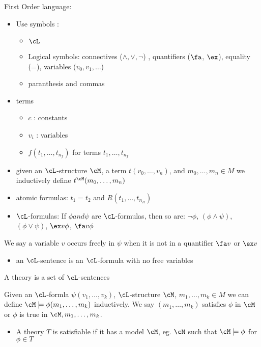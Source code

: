 \noindent
First Order language: 
\begin{itemize}
    \item Use symbols : 
    \begin{itemize}
        \item $\cL$
        \item Logical symbols: connectives ($\wedge, \vee, \neg$) , quantifiers ($\fa$, $\ex$), equality (=), variables ($v_0, v_1, \ldots $) 
        \item paranthesis and commas 
    \end{itemize}
    \item terms 
    \begin{itemize}
        \item $c$ : constants 
        \item $v_i$ : variables 
        \item $f(t_1, \ldots, t_{n_f})$ for terms $t_1, \ldots, t_{n_f}$
    \end{itemize}
    \item given an $\cL$-structure $\cM$, a term $t(v_0, \ldots, v_n)$, and $m_0, \ldots, m_n \in M$ we inductively define $t^{\cM}(m_0, \ldots, m_n)$
    \item atomic formulas: $t_1 = t_2$ and $R(t_1, \ldots, t_{n_R})$
    \item $\cL$-formulas: If $\phi and \psi$ are $\cL$-formulas, then so are: $\neg \phi$, $(\phi \wedge \psi)$, $(\phi \vee \psi)$, $\ex v \phi$, $\fa v \phi$
\end{itemize}

\begin{definition}
    We say a variable $v$ occurs freely in $\psi$ when it is not in a quantifier $\fa v$ or $\ex v$ 
    \begin{itemize}
        \item an $\cL$-sentence is an $\cL$-formula with no free variables 
    \end{itemize}
\end{definition}

\begin{definition}
    A theory is a set of $\cL$-sentences
\end{definition}

\begin{definition}
    Given an $\cL$-formla $\psi(v_1, \ldots, v_k)$, $\cL$-structure $\cM$, $m_1, \ldots, m_k \in M$ we can define $\cM \models \phi(m_1, \ldots, m_k)$ inductively. We say $(m_1, \ldots, m_k)$ satisfies $\phi$ in $\cM$ or $\phi$ is true in $\cM, m_1, \ldots, m_k$.
    \begin{itemize}
        \item A theory $T$ is satisfiable if it has a model $\cM$, eg. $\cM$ such that $\cM \models \phi$ for $\phi \in T$
    \end{itemize}
\end{definition}

